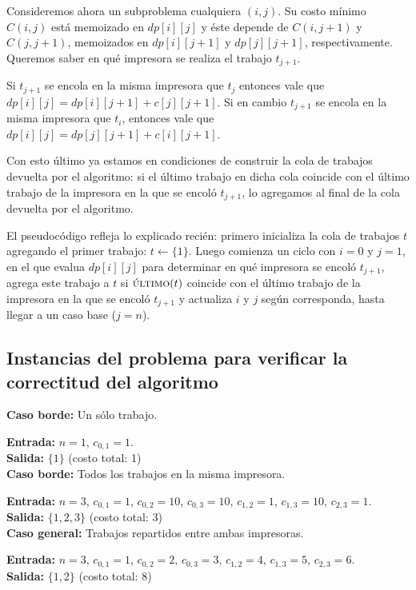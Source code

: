 \documentclass[a4paper, 10pt, twoside]{article}
\begin{document}
Consideremos ahora un subproblema cualquiera $(i, j)$. Su costo mínimo $C(i, j)$ está memoizado en $dp[i][j]$ y éste depende de $C(i, j + 1)$ y $C(j, j + 1)$, memoizados en $dp[i][j + 1]$ y $dp[j][j + 1]$, respectivamente.  Queremos saber en qué impresora se realiza el trabajo $t_{j + 1}$.

Si $t_{j + 1}$ se encola en la misma impresora que $t_j$ entonces vale que $dp[i][j] = dp[i][j + 1] + c[j][j + 1]$. Si en cambio $t_{j + 1}$ se encola en la misma impresora que $t_i$, entonces vale que $dp[i][j] = dp[j][j + 1] + c[i][j + 1]$.

Con esto último ya estamos en condiciones de construir la cola de trabajos devuelta por el algoritmo: si el último trabajo en dicha cola coincide con el último trabajo de la impresora en la que se encoló $t_{j + 1}$, lo agregamos al final de la cola devuelta por el algoritmo.

El pseudocódigo refleja lo explicado recién: primero inicializa la cola de trabajos $t$ agregando el primer trabajo: $t \leftarrow \{ 1 \}$. Luego comienza un ciclo con $i = 0$ y $j = 1$, en el que evalua $dp[i][j]$ para determinar en qué impresora se encoló $t_{j + 1}$, agrega este trabajo a $t$ si $\textsc{último}(t)$ coincide con el último trabajo de la impresora en la que se encoló $t_{j + 1}$ y actualiza $i$ y $j$ según corresponda, hasta llegar a un caso base ($j = n$).


\subsection{Instancias del problema para verificar la correctitud del algoritmo}

\textbf{Caso borde:} Un sólo trabajo.

\textbf{Entrada:} $n = 1$, $c_{0, 1} = 1$. \\
\textbf{Salida:} $\{ 1 \}$ (costo total: 1)
\\

\textbf{Caso borde:} Todos los trabajos en la misma impresora.

\textbf{Entrada:} $n = 3$, $c_{0, 1} = 1$, $c_{0, 2} = 10$, $c_{0, 3} = 10$, 
                           $c_{1, 2} = 1$, $c_{1, 3} = 10$, $c_{2, 3} = 1$. \\
\textbf{Salida:} $\{ 1, 2, 3 \}$ (costo total: 3)
\\

\textbf{Caso general:} Trabajos repartidos entre ambas impresoras.

\textbf{Entrada:} $n = 3$, $c_{0, 1} = 1$, $c_{0, 2} = 2$, $c_{0, 3} = 3$, 
                           $c_{1, 2} = 4$, $c_{1, 3} = 5$, $c_{2, 3} = 6$. \\
\textbf{Salida:} $\{ 1, 2 \}$ (costo total: 8)
\end{document}
